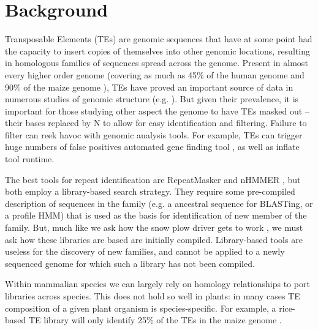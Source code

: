 \documentclass{bmcart}
\begin{document}
\newtheorem{definition}{Definition}
\newtheorem{observation}{Observation}
\newtheorem{lemma}{Lemma}
\newtheorem{theorem}{Theorem}

\section*{Background}
Transposable Elements (TEs) are genomic sequences that have at some
point had the capacity to insert copies of themselves into other
genomic locations, resulting in homologous families of sequences
spread across the genome.  Present in almost every higher
order genome (covering as much as 45\% of the human genome and 90\% of
the maize genome \cite{Venter:2001p92,SanMiguel:1996wa}), TEs have
proved an important source of data in numerous studies of genomic structure (e.g.
\cite{Arndt:2005p279,Karro:2008p123,Mugal:2009p581,Hardison:2003p97}).
But given their prevalence, it is important for those studying other aspect
the genome to have TEs masked out -- their bases replaced by N to
allow for easy identification and filtering.  Failure to filter can
reek havoc with genomic analysis tools.  For example,
TEs can trigger huge numbers of false positives automated gene finding
tool \cite{Jiang:2013jt}, as well as inflate tool runtime.

The best tools for repeat identification are RepeatMasker and nHMMER
\cite{RepeatMaskerOpen:XkNxXSd7,Wheeler:2013gj}, but both employ a
library-based search strategy.  They require some pre-compiled
description of sequences in the family (e.g. a ancestral sequence for
BLASTing, or a profile HMM) that is used as the basis for
identification of new member of the family.  But, much like we ask how
the snow plow driver gets to work \cite{Pratchett:uw}, we must ask how
these libraries are based are initially compiled.  Library-based tools
are useless for the discovery of new families, and cannot be applied
to a newly sequenced genome for which such a library has not been
compiled.


Within mammalian species we can largely rely on homology relationships
to port libraries across species.  This does not hold
so well in plants: in many cases TE composition of a given plant
organism is species-specific.  For example, a rice-based TE library
will only identify 25\% of the TEs in the maize genome
\cite{Jiang:2013jt}.
\end{document}
